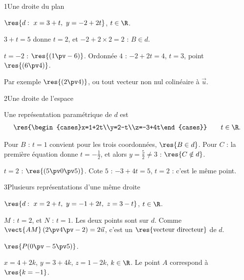 

\begin{deuxcolonnes}

\begin{corrige}{1}{Une droite du plan}
\begin{questions}
  \item $\res{d:\ x=3+t,\ y=-2+2t}$, $t\in\R$.
  \item $3+t=5$ donne $t=2$, et $-2+2\times2=2$ : $B\in d$.
  \item $t=-2$ : $\res{(1\pv-6)}$. Ordonnée $4$ : $-2+2t=4$, $t=3$, point $\res{(6\pv4)}$.
  \item Par exemple $\res{(2\pv4)}$, ou tout vecteur non nul colinéaire à $\vec u$.
\end{questions}
\end{corrige}

\begin{corrige}{2}{Une droite de l'espace}
\begin{questions}
  \item Une représentation paramétrique de $d$ est
    \[\res{\begin{cases}x=1+2t\\y=2-t\\z=-3+4t\end{cases}}\qquad t\in\R.\]
  \item Pour $B$ : $t=1$ convient pour les trois coordonnées, $\res{B\in d}$. Pour $C$ : la première équation donne $t=-\frac12$, et
    alors $y=\frac52\neq3$ : $\res{C\notin d}$.
  \item $t=2$ : $\res{(5\pv0\pv5)}$. Cote $5$ : $-3+4t=5$, $t=2$ : c'est le même point.
\end{questions}
\end{corrige}

\begin{corrige}{3}{Plusieurs représentations d'une même droite}
\begin{questions}
  \item $\res{d:\ x=2+t,\ y=-1+2t,\ z=3-t}$, $t\in\R$.
  \item $M$ : $t=2$, et $N$ : $t=1$. Les deux points sont sur $d$. Comme $\vect{AM}\,(2\pv4\pv-2)=2\vec u$, c'est un
    $\res{\text{vecteur directeur}}$ de $d$.
  \item $\res{P(0\pv-5\pv5)}$.
  \item $x=4+2k$, $y=3+4k$, $z=1-2k$, $k\in\R$. Le point $A$ correspond à $\res{k=-1}$.
\end{questions}
\end{corrige}


\end{deuxcolonnes}
